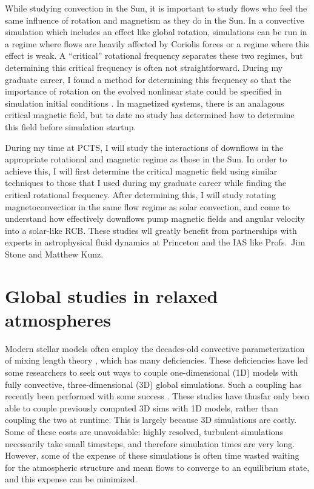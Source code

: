 \documentclass[11pt, preprint]{aastex}
\begin{document}
While studying convection in the Sun, it is important to study flows who feel the same influence of rotation and magnetism as they do in the Sun.
In a convective simulation which includes an effect like global rotation, simulations can be run in a regime where flows are heavily affected by Coriolis forces or a regime where this effect is weak.
A ``critical'' rotational frequency separates these two regimes, but determining this critical frequency is often not straightforward.
During my graduate career, I found a method for determining this frequency so that the importance of rotation on the evolved nonlinear state could be specified in simulation initial conditions \citep[see Fig. \ref{fig:rossby_plot} and][]{anders&all2019}.
In magnetized systems, there is an analagous critical magnetic field, but to date no study has determined how to determine this field before simulation startup.

During my time at PCTS, I will study the interactions of downflows in the appropriate rotational and magnetic regime as those in the Sun.
In order to achieve this, I will first determine the critical magnetic field using similar techniques to those that I used during my graduate career while finding the critical rotational frequency.
After determining this, I will study rotating magnetoconvection in the same flow regime as solar convection, and come to understand how effectively downflows pump magnetic fields and angular velocity into a solar-like RCB.
These studies wll greatly benefit from partnerships with experts in astrophysical fluid dynamics at Princeton and the IAS like Profs.~Jim Stone and Matthew Kunz.

\section{Global studies in relaxed atmospheres}
Modern stellar models often employ the decades-old convective parameterization of mixing length theory \citep{bohm-vitense1958}, which has many deficiencies.
These deficiencies have led some researchers to seek out ways to couple one-dimensional (1D) models with fully convective, three-dimensional (3D) global simulations.
Such a coupling has recently been performed with some success \citep{jorgensen&weiss2019}.
These studies have thusfar only been able to couple previously computed 3D sims with 1D models, rather than coupling the two at runtime.
This is largely because 3D simulations are costly.
Some of these costs are unavoidable: highly resolved, turbulent simulations necessarily take small timesteps, and therefore simulation times are very long.
However, some of the expense of these simulations is often time wasted waiting for the atmospheric structure and mean flows to converge to an equilibrium state, and this expense can be minimized.
\end{document}
